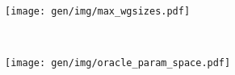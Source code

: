 \begin{subfigure}[t]{0.98\textwidth}
\centering
\texttt{[image: gen/img/max\_wgsizes.pdf]}
\vspace{-1.5em} %
\caption{}
\label{fig:max-wgsizes}
\end{subfigure}
\\
\begin{subfigure}[t]{0.98\textwidth}
\centering
\texttt{[image: gen/img/oracle\_param\_space.pdf]}
\vspace{-1.5em} %
\caption{}
\label{fig:oracle-wgsizes}
\end{subfigure}
